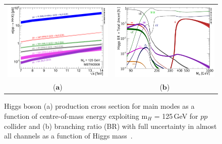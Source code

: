 \begin{figure}[htp]
\centering
\begin{tabular}{cc}
\hspace{-0.3cm}
\includegraphics[scale=0.278]{fig/sm_beyond/7_14_xsec.png}
& \hspace{-0.5cm} \includegraphics[scale=0.38]{fig/sm_beyond/Higgs_BR_RECT.png}\\
   ($\mathbf{a}$)\qquad&($\mathbf{b}$)\qquad\\
\end{tabular}
\caption{\label{fig:sm_higgsxsec_BR} Higgs boson (a) production cross section for main modes as a function of centre-of-mass energy exploiting m$_{H}$ = 125\,GeV for $pp$ collider and (b) branching ratio (BR) with full uncertainty in almost all channels as a function of Higgs mass~\cite{pub:sm_higgsxsec}.}
\end{figure} 
